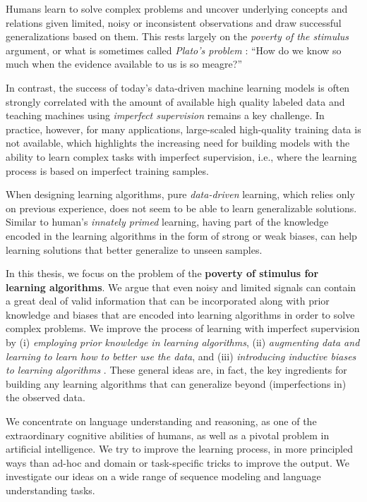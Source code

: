\abstract
Humans learn to solve complex problems and uncover underlying concepts and relations given limited, noisy or inconsistent observations and draw successful generalizations based on them. This rests largely on the \emph{poverty of the stimulus} argument, or what is sometimes called \emph{Plato’s problem}%
: ``How do we know so much when the evidence available to us is so meagre?''

In contrast, the success of today's data-driven machine learning models is often strongly correlated with the amount of available high quality labeled data
and teaching machines using \emph{imperfect supervision} remains a key challenge. In practice, however, for many applications, large-scaled high-quality training data is not available, which highlights the increasing need for building models with the ability to learn complex tasks with imperfect supervision, i.e., where the learning process is based on imperfect training samples. %

When designing learning algorithms, pure \emph{data-driven} learning, which relies only on previous experience, does not seem to be able to learn generalizable solutions.
Similar to human's \emph{innately primed} learning, having part of the knowledge encoded in the learning algorithms in the form of strong or weak biases, can help learning solutions that better generalize to unseen samples. %

In this thesis, we focus on the problem of the \textbf{poverty of stimulus for learning algorithms}. We argue that even noisy and limited signals can contain a great deal of valid information that can be incorporated along with prior knowledge and biases that are encoded into learning algorithms in order to solve complex problems. We improve the process of learning with imperfect supervision by (i) \emph{employing  prior knowledge in learning algorithms}, (ii) \emph{augmenting data and learning to learn how to better use the data}, and (iii) \emph{introducing inductive biases to learning algorithms} . 
%
These general ideas are, in fact, the key ingredients for building any learning algorithms that can generalize beyond (imperfections in) the observed data. %

We concentrate on language understanding and reasoning, as one of the extraordinary cognitive abilities of humans, as well as a pivotal problem in artificial intelligence. We try to improve the learning process, in more principled ways than ad-hoc and domain or task-specific tricks to improve the output. We investigate our ideas on a wide range of sequence modeling and language understanding tasks.


